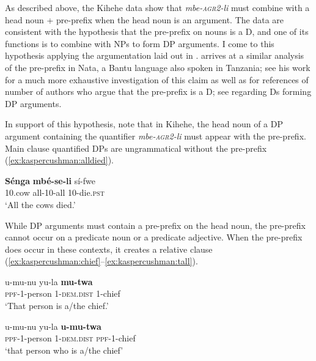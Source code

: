 \documentclass[letterpaper, 12pt]{article}
\begin{document}
As described above, the Kihehe data show that \textit{mbe-\textsc{agr2}-li} must combine with a head noun + pre-prefix when the head noun is an argument. The data are consistent with the hypothesis that the pre-prefix on nouns is a D, and one of its functions is to combine with NPs to form DP arguments. I come to this hypothesis applying the argumentation laid out in \citealt{matthewson01}. \citealt{gambarage16} arrives at a similar analysis of the pre-prefix in Nata, a Bantu language also spoken in Tanzania; see his work for a much more exhaustive investigation of this claim as well as for references of number of authors who argue that the pre-prefix is a D; see \citealt{longobardi94} regarding Ds forming DP arguments.

In support of this hypothesis, note that in Kihehe, the head noun of a DP argument containing the quantifier \textit{mbe-\textsc{agr2}-li} must appear with the pre-prefix. Main clause quantified DPs are ungrammatical without the pre-prefix (\ref{ex:kaspercushman:alldied}).

\begin{exe}

\ex \label{ex:kaspercushman:alldied} \gll * \textbf{S\'enga} \textbf{mb\'e-se-li} s\'i-fwe \label{ex:kaspercushman:allcowsnoppf2}\\ 
{} 10.cow all-10-all 10-die.\textsc{pst} \\
`All the cows died.' 

\end{exe}

While DP arguments must contain a pre-prefix on the head noun, the pre-prefix cannot occur on a predicate noun or a predicate adjective. When the pre-prefix does occur in these contexts, it creates a relative clause (\ref{ex:kaspercushman:chief}--\ref{ex:kaspercushman:tall}). 

\begin{exe}
\ex \label{ex:kaspercushman:chief} \begin{xlist}

\ex \gll u-mu-nu yu-la \textbf{mu-twa} \\
\textsc{ppf}-1-person 1-\textsc{dem.dist} 1-chief \\
`That person is a/the chief.'


\ex \gll u-mu-nu yu-la \textbf{u-mu-twa} \\
\textsc{ppf}-1-person 1-\textsc{dem.dist} \textsc{ppf}-1-chief \\
`that person who is a/the chief'

\end{xlist}
\end{exe}
\end{document}
